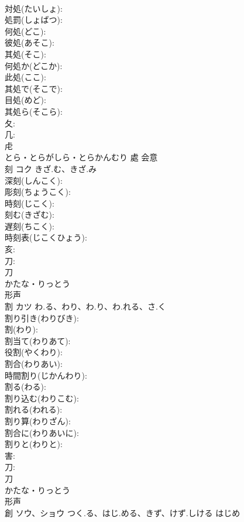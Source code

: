 \documentclass[8pt]{extreport}
\begin{document}
\begin{CJK}{UTF8}{min}
\\	対処(たいしょ): 
\\	処罰(しょばつ): 
\\	何処(どこ): 
\\	彼処(あそこ): 
\\	其処(そこ): 
\\	何処か(どこか): 
\\	此処(ここ): 
\\	其処で(そこで): 
\\	目処(めど): 
\\	其処ら(そこら): 
\\	夂: 
\\	几: 
\\	虍	
\\	とら・とらがしら・とらかんむり	處	会意 
\\	刻	コク	きざ.む、きざ.み		
\\	深刻(しんこく): 
\\	彫刻(ちょうこく): 
\\	時刻(じこく): 
\\	刻む(きざむ): 
\\	遅刻(ちこく): 
\\	時刻表(じこくひょう): 
\\	亥: 
\\	刀: 
\\	刀	
\\	かたな・りっとう	
\\	形声 
\\	割	カツ	わ.る、わり、わ.り、わ.れる、さ.く		
\\	割り引き(わりびき): 
\\	割(わり): 
\\	割当て(わりあて): 
\\	役割(やくわり): 
\\	割合(わりあい): 
\\	時間割り(じかんわり): 
\\	割る(わる): 
\\	割り込む(わりこむ): 
\\	割れる(われる): 
\\	割り算(わりざん): 
\\	割合に(わりあいに): 
\\	割りと(わりと): 
\\	害: 
\\	刀: 
\\	刀	
\\	かたな・りっとう	
\\	形声 
\\	創	ソウ、ショウ	つく.る、はじ.める、きず、けず.しける	はじめ	

\end{CJK}
\end{document}

